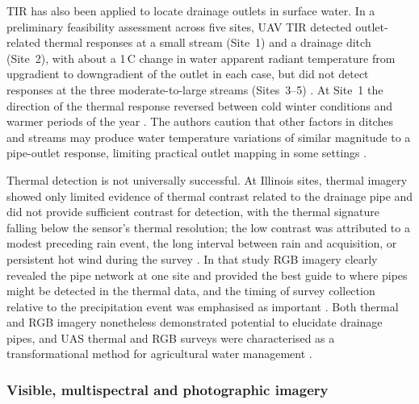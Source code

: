 TIR has also been applied to locate drainage outlets in surface water. In a preliminary feasibility assessment across five sites, UAV TIR detected outlet-related thermal responses at a small stream (Site~1) and a drainage ditch (Site~2), with about a 1\,\textdegree C change in water apparent radiant temperature from upgradient to downgradient of the outlet in each case, but did not detect responses at the three moderate-to-large streams (Sites~3--5) \parencite{Allred2022}. At Site~1 the direction of the thermal response reversed between cold winter conditions and warmer periods of the year \parencite{Allred2022}. The authors caution that other factors in ditches and streams may produce water temperature variations of similar magnitude to a pipe-outlet response, limiting practical outlet mapping in some settings \parencite{Allred2022}.

Thermal detection is not universally successful. At Illinois sites, thermal imagery showed only limited evidence of thermal contrast related to the drainage pipe and did not provide sufficient contrast for detection, with the thermal signature falling below the sensor's thermal resolution; the low contrast was attributed to a modest preceding rain event, the long interval between rain and acquisition, or persistent hot wind during the survey \parencite{Kratt2020}. In that study RGB imagery clearly revealed the pipe network at one site and provided the best guide to where pipes might be detected in the thermal data, and the timing of survey collection relative to the precipitation event was emphasised as important \parencite{Kratt2020}. Both thermal and RGB imagery nonetheless demonstrated potential to elucidate drainage pipes, and UAS thermal and RGB surveys were characterised as a transformational method for agricultural water management \parencite{Kratt2020}.

\subsubsection{Visible, multispectral and photographic imagery}

